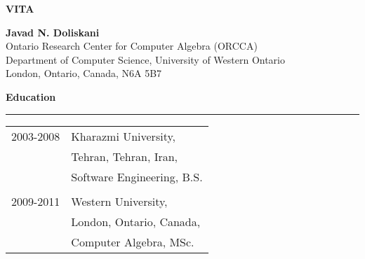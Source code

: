 
\thispagestyle{empty}
\vspace*{0.5in}

\begin{center}
\textbf{VITA}
\end{center}

\begin{center}
\textbf{Javad N. Doliskani}\\
\bigskip
Ontario Research Center for Computer Algebra (ORCCA)\\
Department of Computer Science, University of Western Ontario\\
London, Ontario, Canada, N6A 5B7\\
\end{center}

\textbf{Education}
\smallskip
\hrule
\smallskip
\begin{tabular}{ll}
2003-2008 & Kharazmi University, \\
& Tehran, Tehran, Iran,\\
& Software Engineering, B.S. \\
& \\
2009-2011 & Western University, \\
& London, Ontario, Canada, \\
& Computer Algebra, MSc.
\end{tabular}
